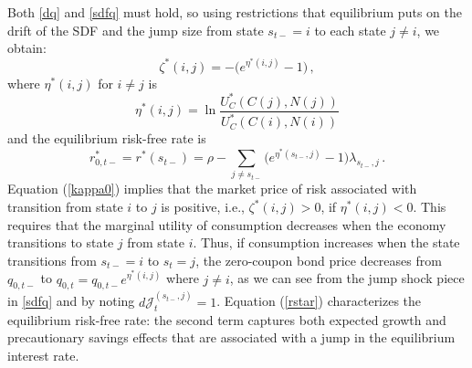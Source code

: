 \documentclass[12pt]{article}
\newcommand{\NW}[1]{{\textcolor{blue}{#1}}}
\begin{document}
Both \eqref{dq} and \eqref{sdfq} must hold, so using restrictions that equilibrium  puts on  the drift of the SDF  and the jump size from state $s_{t-}=i$ to each state $j\neq i$, we obtain: %
\begin{equation}
\zeta^*(i, j) = -\big(e^{\eta^*(i, j)}-1 \big)\,,
\end{equation}
where {$\eta^*(i,j)$ for  $i\neq j$} is  %
\begin{equation}\label{kappa0} 
\eta^*(i, j)= \ln\frac{U_C^*(C(j), N(j))}{U_C^*(C(i), N(i))} \end{equation}
and the equilibrium risk-free rate is  
\begin{equation}\label{rstar}
r^{*}_{0, t-} =r^{*}(s_{t-}) = \rho-\sum_{j\neq s_{t-}}\big(e^{\eta^{*}(s_{t-}, j)}-1\big)\lambda_{s_{t-}, j} \,. %
\end{equation}
Equation (\ref{kappa0}) implies that the market price of risk associated with  transition from state $i$ to $j$ is positive, i.e., $\zeta^*(i,j)>0$, if $\eta^*(i, j)<0$. This requires that the marginal utility of consumption decreases when the economy transitions to state $j$ from state $i$. %
Thus, if consumption increases 
when  the state transitions from  $s_{t-}=i$ to $s_t=j$, the zero-coupon bond price   decreases from  $q_{0,t-}$ to $q_{0,t}=q_{0,t-}e^{\eta^*(i, j)} $ where $j\neq i$,  %
as we can see from the jump shock piece in \eqref{sdfq} and by noting $d {\mathcal J}_t^{(s_{t-}, j)} =1$. 
Equation (\ref{rstar}) characterizes the equilibrium risk-free rate: the second term captures both expected growth and 
precautionary savings effects that are associated with a jump in  the equilibrium interest rate. %
\end{document}
